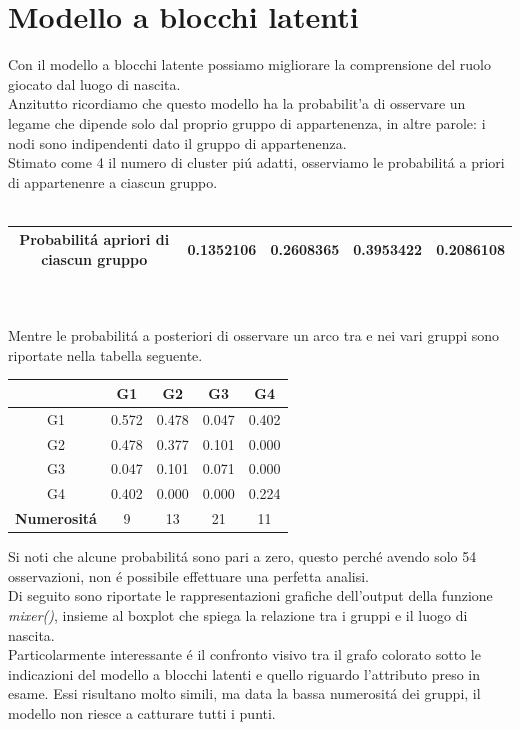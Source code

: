 \documentclass[11pt,a4paper]{report}
\begin{document}
\chapter{Modello a blocchi latenti}
Con il modello a blocchi latente possiamo migliorare la comprensione del ruolo giocato dal luogo di nascita. 
\\
Anzitutto ricordiamo che questo modello ha la probabilit'a di osservare un legame che dipende solo dal proprio gruppo di appartenenza, in altre parole: i nodi sono indipendenti dato il gruppo di appartenenza.
\\
Stimato come 4 il numero di cluster pi\'u adatti, osserviamo le probabilit\'a a priori di appartenenre a ciascun gruppo.
\\
\\
\begin{tabular}{c|c|c|c|c}
	\hline 
	Probabilit\'a apriori di ciascun gruppo &       0.1352106& 0.2608365& 0.3953422& 0.2086108 \\ 
	\hline 
\end{tabular} 
\\
\\
Mentre le probabilit\'a a posteriori di osservare un arco tra e nei vari gruppi sono riportate nella tabella seguente.
\\
\begin{center}
\begin{tabular}{c|c|c|c|c}
		
		&  G1&  G2 & G3 &  G4\\ 
		\hline 
		G1&  0.572 &  0.478& 0.047 &  0.402
		\\ 
		\hline 
		G2&  0.478  &0.377   & 0.101  & 0.000 \\ 
		\hline 
		G3& 0.047  & 0.101 & 0.071  &0.000   \\ 
		\hline 
		G4& 0.402 &0.000&  0.000    & 0.224  \\ 
		\hline
		\hline
		\textbf{Numerosit\'a}&9 & 13 & 21& 11\\ 
	\end{tabular} 
\end{center}
Si noti che alcune probabilit\'a sono pari a zero, questo perch\'e avendo solo 54 osservazioni, non \'e possibile effettuare una perfetta analisi.
\\
Di seguito sono riportate le rappresentazioni grafiche dell'output della funzione \emph{mixer()}, insieme al boxplot che spiega la relazione tra i gruppi e il luogo di nascita.
\\
Particolarmente interessante \'e il confronto visivo tra il grafo colorato sotto le indicazioni del modello a blocchi latenti e quello riguardo l'attributo preso in esame. Essi risultano molto simili, ma data la bassa numerosit\'a dei gruppi, il modello non riesce a catturare tutti i punti.
\end{document}
